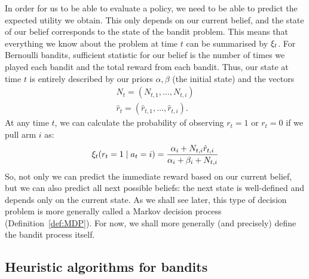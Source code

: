 In order for us to be able to evaluate a policy, we need to be able to
predict the expected utility we obtain. This only depends on our
current belief, and the state of our belief corresponds to the state
of the bandit problem. This means that
everything we know about the problem at time $t$ can be summarised by
$\xi_t$. For Bernoulli bandits, sufficient statistic for our belief
is the number of times we played each bandit and the total reward from
each bandit.  Thus, our state at time $t$ is entirely described by our
priors $\alpha, \beta$ (the initial state) and the vectors
\begin{align}
  N_t = (N_{t,1}, \ldots, N_{t,i})\\
  \hat{r}_t = (\hat{r}_{t,1}, \ldots, \hat{r}_{t,i}).
\end{align}
At any time $t$, we can calculate the probability of observing
$r_t = 1$ or $r_t = 0$ if we pull arm $i$ as:
\[
\xi_t(r_t = 1 \mid a_t = i) = \frac{\alpha_i + N_{t,i} \hat{r}_{t,i}}{\alpha_i + \beta_i + N_{t,i}}
\]
So, not only we can predict the immediate reward based on our current
belief, but we can also predict all next possible beliefs: the next
state is well-defined and depends only on the current state.  As we
shall see later, this type of decision problem is more generally called a Markov
decision process (Definition~\ref{def:MDP}). For now, we shall more generally (and precisely) define the bandit process itself.

\subsection{Heuristic algorithms for bandits}

